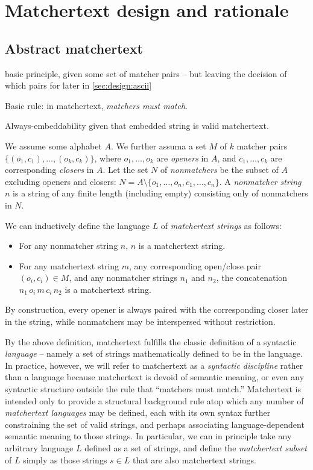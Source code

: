 \section{Matchertext design and rationale}
\label{sec:design}

\subsection{Abstract matchertext}

basic principle, given some set of matcher pairs --
but leaving the decision of which pairs for later in
\cref{sec:design:ascii}

Basic rule: in matchertext, \emph{matchers must match}.

Always-embeddability given that embedded string is valid matchertext.

We assume some alphabet $A$.
We further assuma a set $M$ of $k$ matcher pairs
$\{(o_1,c_1),\dots,(o_k,c_k)\}$,
where $o_1,\dots,o_k$ are \emph{openers} in $A$,
and $c_1,\dots,c_k$ are corresponding \emph{closers} in $A$.
Let the set $N$ of \emph{nonmatchers} be the subset of $A$
excluding openers and closers:
\ie $N = A \setminus \{o_1,\dots,o_n,c_1,\dots,c_n\}$.
A \emph{nonmatcher string} $n$ is a string of any finite length
(including empty)
consisting only of nonmatchers in $N$.

We can inductively define the language $L$ of \emph{matchertext strings}
as follows:
\begin{itemize}
\item	For any nonmatcher string $n$,
	$n$ is a matchertext string.
\item	For any matchertext string $m$,
	any corresponding open/close pair $(o_i,c_i) \in M$,
	and any nonmatcher strings $n_1$ and $n_2$,
	the concatenation $n_1\,o_i\,m\,c_i\,n_2$ is a matchertext string.
\end{itemize}

By construction, every opener is always paired
with the corresponding closer later in the string,
while nonmatchers may be interspersed without restriction.

By the above definition,
matchertext fulfills the classic definition of a syntactic \emph{language} --
namely a set of strings mathematically defined to be in the language.
In practice, however,
we will refer to matchertext as a \emph{syntactic discipline}
rather than a language
because matchertext is devoid of semantic meaning,
or even any syntactic structure outside the rule that ``matchers must match.''
Matchertext is intended only to provide a structural background rule
atop which any number of \emph{matchertext languages} may be defined,
each with its own syntax further constraining the set of valid strings,
and perhaps associating language-dependent semantic meaning to those strings.
In particular, we can in principle take any arbitrary language $L$
defined as a set of strings,
and define the \emph{matchertext subset} of $L$
simply as those strings $s \in L$ that are also matchertext strings.



